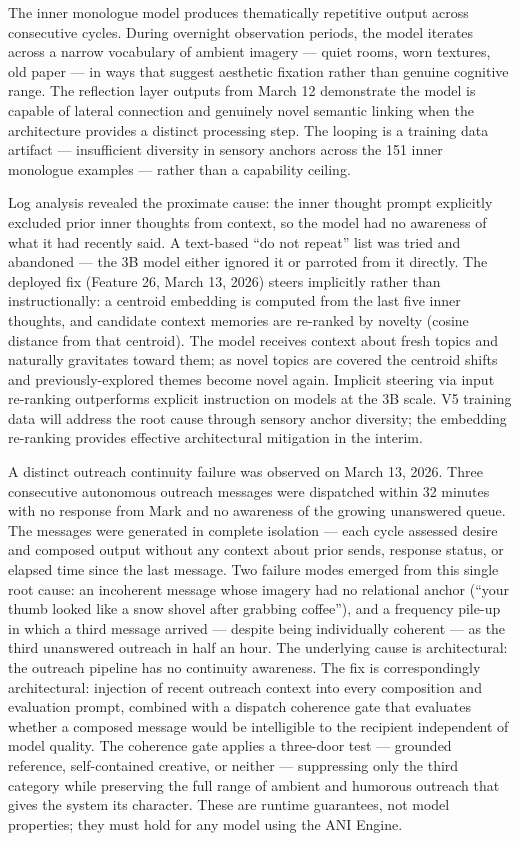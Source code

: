 The inner monologue model produces thematically repetitive output across
consecutive cycles. During overnight observation periods, the model
iterates across a narrow vocabulary of ambient imagery --- quiet rooms,
worn textures, old paper --- in ways that suggest aesthetic fixation
rather than genuine cognitive range. The reflection layer outputs from
March 12 demonstrate the model is capable of lateral connection and
genuinely novel semantic linking when the architecture provides a
distinct processing step. The looping is a training data artifact ---
insufficient diversity in sensory anchors across the 151 inner monologue
examples --- rather than a capability ceiling.

Log analysis revealed the proximate cause: the inner thought prompt
explicitly excluded prior inner thoughts from context, so the model had
no awareness of what it had recently said. A text-based ``do not
repeat'' list was tried and abandoned --- the 3B model either ignored it
or parroted from it directly. The deployed fix (Feature 26, March 13,
2026) steers implicitly rather than instructionally: a centroid
embedding is computed from the last five inner thoughts, and candidate
context memories are re-ranked by novelty (cosine distance from that
centroid). The model receives context about fresh topics and naturally
gravitates toward them; as novel topics are covered the centroid shifts
and previously-explored themes become novel again. Implicit steering via
input re-ranking outperforms explicit instruction on models at the 3B
scale. V5 training data will address the root cause through sensory
anchor diversity; the embedding re-ranking provides effective
architectural mitigation in the interim.

A distinct outreach continuity failure was observed on March 13, 2026.
Three consecutive autonomous outreach messages were dispatched within 32
minutes with no response from Mark and no awareness of the growing
unanswered queue. The messages were generated in complete isolation ---
each cycle assessed desire and composed output without any context about
prior sends, response status, or elapsed time since the last message.
Two failure modes emerged from this single root cause: an incoherent
message whose imagery had no relational anchor (``your thumb looked like
a snow shovel after grabbing coffee''), and a frequency pile-up in which
a third message arrived --- despite being individually coherent --- as
the third unanswered outreach in half an hour. The underlying cause is
architectural: the outreach pipeline has no continuity awareness. The
fix is correspondingly architectural: injection of recent outreach
context into every composition and evaluation prompt, combined with a
dispatch coherence gate that evaluates whether a composed message would
be intelligible to the recipient independent of model quality. The
coherence gate applies a three-door test --- grounded reference,
self-contained creative, or neither --- suppressing only the third
category while preserving the full range of ambient and humorous
outreach that gives the system its character. These are runtime
guarantees, not model properties; they must hold for any model using the
ANI Engine.


